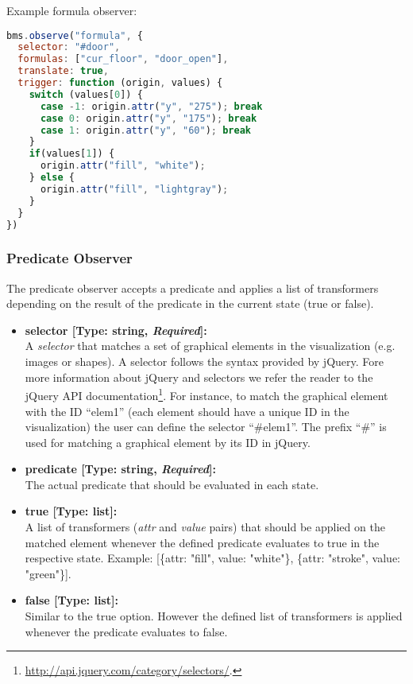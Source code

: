 Example formula observer:

\begin{lstlisting}[language=JavaScript]
bms.observe("formula", {
  selector: "#door",
  formulas: ["cur_floor", "door_open"],
  translate: true,
  trigger: function (origin, values) {
    switch (values[0]) {
      case -1: origin.attr("y", "275"); break
      case 0: origin.attr("y", "175"); break
      case 1: origin.attr("y", "60"); break
    }
    if(values[1]) {
      origin.attr("fill", "white");
    } else {
      origin.attr("fill", "lightgray");
    }
  }
})
\end{lstlisting}

\subsubsection{Predicate Observer}

The predicate observer accepts a predicate and applies a list of transformers depending on the result of the predicate in the current state (true or false).

\begin{itemize}
	\item[] \textbf{selector [Type: string, \textit{Required}]:}\\ A \textit{selector} that matches a set of graphical elements in the visualization (e.g. images or shapes). 
A selector follows the syntax provided by jQuery.
Fore more information about jQuery and selectors we refer the reader to the jQuery API documentation\footnote{\url{http://api.jquery.com/category/selectors/}.}. 
For instance, to match the graphical element with the ID ``elem1'' (each element should have a unique ID in the visualization) the user can define the selector ``\#elem1''.
The prefix ``\#'' is used for matching a graphical element by its ID in jQuery.
	\item[] \textbf{predicate [Type: string, \textit{Required}]:}\\ The actual predicate that should be evaluated in each state.
	\item[] \textbf{true [Type: list]:}\\ A list of transformers (\textit{attr} and \textit{value} pairs) that should be applied on the matched element whenever the defined predicate evaluates to true in the respective state. Example: 
  [\{attr: "fill", value: "white"\}, \{attr: "stroke", value: "green"\}].
	\item[] \textbf{false [Type: list]:}\\ Similar to the true option.
	However the defined list of transformers is applied whenever the predicate evaluates to false.
\end{itemize}

